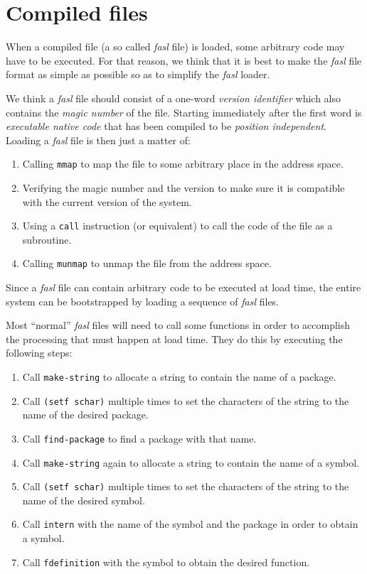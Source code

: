 \chapter{Compiled files}
\label{chap-compiled-files}

When a compiled file (a so called \emph{fasl} file) is loaded, some
arbitrary code may have to be executed.  For that reason, we think
that it is best to make the \emph{fasl} file format as simple as
possible so as to simplify the \emph{fasl} loader.

We think a \emph{fasl} file should consist of a one-word \emph{version
  identifier} which also contains the \emph{magic number} of the
file.  Starting immediately after the first word is \emph{executable
  native code} that has been compiled to be \emph{position
  independent}.  Loading a \emph{fasl} file is then just a matter of:

\begin{enumerate}
\item Calling \texttt{mmap} to map the file to some arbitrary place in
  the address space.
\item Verifying the magic number and the version to make sure it is
  compatible with the current version of the system. 
\item Using a \texttt{call} instruction (or equivalent) to call the
  code of the file as a subroutine.
\item Calling \texttt{munmap} to unmap the file from the address
  space. 
\end{enumerate}

Since a \emph{fasl} file can contain arbitrary code to be executed at
load time, the entire system can be bootstrapped by loading a sequence
of \emph{fasl} files. 

Most ``normal'' \emph{fasl} files will need to call some functions in
order to accomplish the processing that must happen at load time.
They do this by executing the following steps:

\begin{enumerate}
\item Call \texttt{make-string} to allocate a string to contain the
  name of a package.
\item Call \texttt{(setf schar)} multiple times to set the characters
  of the string to the name of the desired package.
\item Call \texttt{find-package} to find a package with that name.
\item Call \texttt{make-string} again to allocate a string to contain
  the name of a symbol.
\item Call \texttt{(setf schar)} multiple times to set the characters
  of the string to the name of the desired symbol.
\item Call \texttt{intern} with the name of the symbol and the package
  in order to obtain a symbol.
\item Call \texttt{fdefinition} with the symbol to obtain the desired
  function. 
\end{enumerate}

